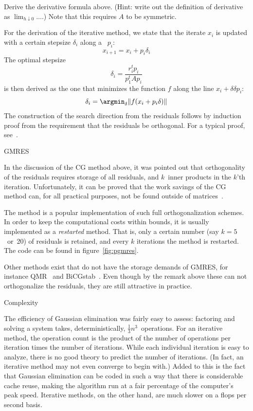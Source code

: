 \begin{exercise}
  Derive the derivative formula above. (Hint: write out the definition
  of derivative as $\lim_{h\downarrow0}\ldots$.) Note that this
  requires $A$ to be symmetric.
\end{exercise}

For the derivation of the iterative method, we state that the iterate
$x_i$ is updated with a certain stepsize $\delta_i$ along a
~$p_i$:
\[ x_{i+1} = x_i+p_i\delta_i \]
The optimal stepsize
\[ \delta_i=\frac{r_i^tp_i}{p_1^tAp_i} \]
is then derived as the one that minimizes the function $f$ along the
line $x_i+\delta\delta p_i$:
\[ \delta_i = \argmin_\delta \| f(x_i+p_i\delta) \| \]
The construction of the search direction from the residuals follows by
induction proof from the requirement that the residuals be
orthogonal. For a typical proof, see~\cite{AxBa:febook}.

 {GMRES}
\label{sec:gmres}

In the discussion of the \ac{CG} method above, it was pointed out that
orthogonality of the residuals requires storage of all residuals, and
$k$~inner products in the $k$'th iteration. Unfortunately, it can be
proved that the work savings of the \ac{CG} method can, for all
practical purposes, not be found outside of 
matrices~\cite{fama84}.

The  method is a popular implementation of such full
orthogonalization schemes. In order to keep the computational costs
within bounds, it is usually implemented as a \emph{restarted}
method. That is, only a certain number (say $k=5$~or~20) of residuals
is retained, and every $k$ iterations the method is restarted. The
code can be found in figure~\ref{fig:pgmres}.



Other methods exist that do not have the storage demands of
\ac{GMRES}, for instance QMR~\cite{FrNa:qmr} and
BiCGstab~\cite{vdVorst1992:bicgstab}. Even though by the remark above
these can not orthogonalize the residuals, they are still attractive
in practice.

 {Complexity}

The efficiency of Gaussian elimination was fairly easy to assess:
factoring and solving a system takes, deterministically,
$\frac13n^3$~operations. For an iterative method, the operation count
is the product of the number of operations per iteration times the
number of iterations. While each individual iteration is easy to
analyze, there is no good theory to predict the number of
iterations. (In fact, an iterative method may not even converge to
begin with.) Added to this is the fact that Gaussian elimination can
be coded in such a way that there is considerable cache reuse, making
the algorithm run at a fair percentage of the computer's peak
speed. Iterative methods, on the other hand, are much slower on a
flops per second basis.

